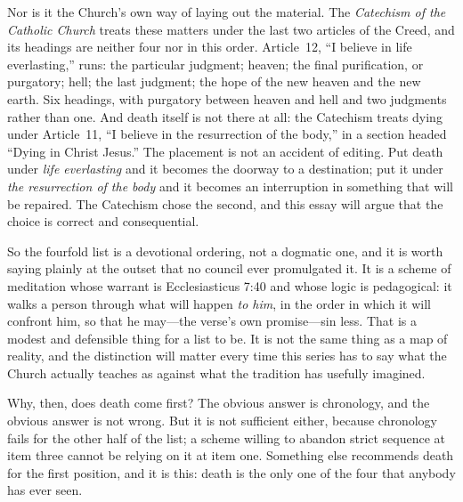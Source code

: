 Nor is it the Church's own way of laying out the material. The \emph{Catechism of the Catholic Church} treats these matters under the last two articles of the Creed, and its headings are neither four nor in this order. Article~12, ``I believe in life everlasting,'' runs: the particular judgment; heaven; the final purification, or purgatory; hell; the last judgment; the hope of the new heaven and the new earth. Six headings, with purgatory between heaven and hell and two judgments rather than one. And death itself is not there at all: the Catechism treats dying under Article~11, ``I believe in the resurrection of the body,'' in a section headed ``Dying in Christ Jesus.'' The placement is not an accident of editing. Put death under \emph{life everlasting} and it becomes the doorway to a destination; put it under \emph{the resurrection of the body} and it becomes an interruption in something that will be repaired. The Catechism chose the second, and this essay will argue that the choice is correct and consequential.

So the fourfold list is a devotional ordering, not a dogmatic one, and it is worth saying plainly at the outset that no council ever promulgated it. It is a scheme of meditation whose warrant is Ecclesiasticus 7:40 and whose logic is pedagogical: it walks a person through what will happen \emph{to him}, in the order in which it will confront him, so that he may---the verse's own promise---sin less. That is a modest and defensible thing for a list to be. It is not the same thing as a map of reality, and the distinction will matter every time this series has to say what the Church actually teaches as against what the tradition has usefully imagined.

Why, then, does death come first? The obvious answer is chronology, and the obvious answer is not wrong. But it is not sufficient either, because chronology fails for the other half of the list; a scheme willing to abandon strict sequence at item three cannot be relying on it at item one. Something else recommends death for the first position, and it is this: death is the only one of the four that anybody has ever seen.

